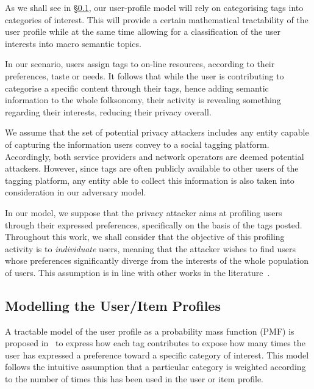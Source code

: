 As we shall see in \S \ref{sec:mod-profiles}, our user-profile model will rely on categorising tags into categories of interest. This will provide a certain mathematical tractability of the user profile while at the same time allowing for a classification of the user interests into macro semantic topics.

In our scenario, users assign tags to on-line resources, according to their preferences, taste or needs. It follows that while the user is contributing to categorise a specific content through their tags, hence adding semantic information to the whole folksonomy, their activity is revealing something regarding their interests, reducing their privacy overall.

We assume that the set of potential privacy attackers includes any entity capable of capturing the information users convey to a social tagging platform. Accordingly, both service providers and network operators are deemed potential attackers. However, since tags are often publicly available to other users of the tagging platform, any entity able to collect this information is also taken into consideration in our adversary model.

In our model, we suppose that the privacy attacker aims at profiling users through their expressed preferences, specifically on the basis of the tags posted. Throughout this work, we shall consider that the objective of this profiling activity is to \emph{individuate} users, meaning that the attacker wishes to find users whose preferences significantly diverge from the interests of the whole population of users. This assumption is in line with other works in the literature~\cite{parra2014measuring,Parra13PhD,parra2014optimal}.

\subsection{Modelling the User/Item Profiles}
\label{sec:mod-profiles}
A tractable model of the user profile as a probability mass function (PMF) is proposed in~\cite{Parra10TB,Parra12DKE,Parra12TKDE,Parra13PhD} to express how each tag contributes to expose how many times the user has expressed a preference toward a specific category of interest. This model follows the intuitive assumption that a particular category is weighted according to the number of times this has been used in the user or item profile.

